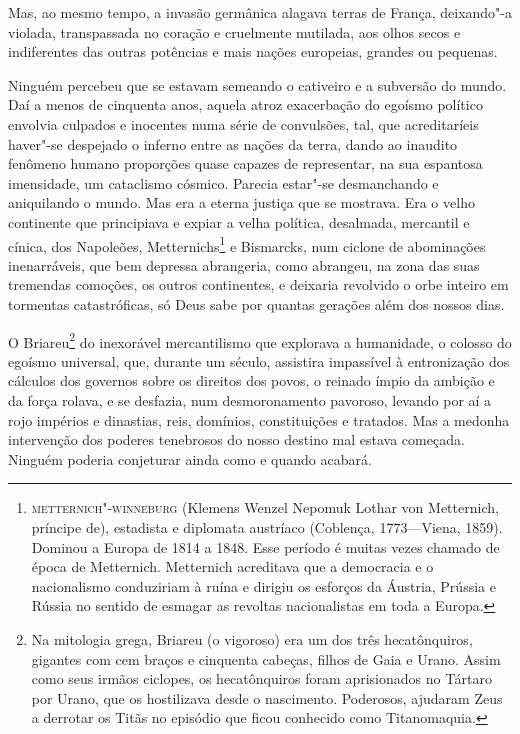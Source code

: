 Mas, ao mesmo tempo, a invasão germânica alagava terras de França,
deixando"-a violada, transpassada no coração e cruelmente mutilada, aos
olhos secos e indiferentes das outras potências e mais nações
europeias, grandes ou pequenas.

Ninguém percebeu que se estavam semeando o cativeiro e a subversão
do mundo. Daí a menos de cinquenta anos, aquela atroz exacerbação do
egoísmo político envolvia culpados e inocentes numa série de
convulsões, tal, que acreditaríeis haver"-se despejado o inferno entre
as nações da terra, dando ao inaudito fenômeno humano proporções quase
capazes de representar, na sua espantosa imensidade, um cataclismo
cósmico. Parecia estar"-se desmanchando e aniquilando o mundo. Mas era a
eterna justiça que se mostrava. Era o velho continente que principiava
e expiar a velha política, desalmada, mercantil e cínica, dos
Napoleões, Metternichs\footnote{ \textsc{metternich"-winneburg} (Klemens Wenzel Nepomuk
Lothar von Metternich, príncipe de), estadista e diplomata
austríaco (Coblença, 1773---Viena, 1859). Dominou a Europa de 1814 a
1848. Esse período é muitas vezes chamado de época de
Metternich. Metternich acreditava que a democracia e o nacionalismo
conduziriam à ruína e dirigiu os esforços da Áustria, Prússia e Rússia
no sentido de esmagar as revoltas nacionalistas em toda a Europa.} 
e Bismarcks, num ciclone de abominações 
inenarráveis, que bem depressa abrangeria, como
abrangeu, na zona das suas tremendas comoções, os outros continentes, e
deixaria revolvido o orbe inteiro em tormentas catastróficas, só Deus
sabe por quantas gerações além dos nossos dias.

O Briareu\footnote{ Na mitologia grega, Briareu (o vigoroso) era
um dos três hecatônquiros, gigantes com cem
braços e cinquenta cabeças, filhos de Gaia e
Urano. Assim como seus irmãos
ciclopes, os hecatônquiros foram aprisionados
no Tártaro por Urano, que os hostilizava desde
o nascimento. Poderosos, ajudaram Zeus a
derrotar os Titãs no episódio que ficou
conhecido como Titanomaquia.} do
inexorável mercantilismo que explorava a humanidade, o colosso do
egoísmo universal, que, durante um século, assistira impassível à
entronização dos cálculos dos governos sobre os direitos dos povos, o
reinado ímpio da ambição e da força rolava, e se desfazia, num
desmoronamento pavoroso, levando por aí a rojo impérios e dinastias,
reis, domínios, constituições e tratados. Mas a medonha intervenção dos
poderes tenebrosos do nosso destino mal estava começada. Ninguém
poderia conjeturar ainda como e quando acabará.

